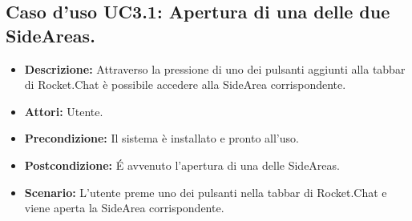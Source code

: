 \subsection{Caso d'uso UC3.1: Apertura di una delle due SideAreas.}
\begin{itemize}
\item[]\textbf{Descrizione:} Attraverso la pressione di uno dei pulsanti aggiunti alla tabbar di Rocket.Chat è possibile accedere alla SideArea corrispondente.
\item[]\textbf{Attori:} Utente. 
\item[]\textbf{Precondizione:} Il sistema è installato e pronto all'uso. 
\item[]\textbf{Postcondizione:} \'E avvenuto l'apertura di una delle SideAreas. 
\item[]\textbf{Scenario:}
L'utente preme uno dei pulsanti nella tabbar di Rocket.Chat e viene aperta la SideArea corrispondente. 
\end{itemize}

\clearpage


